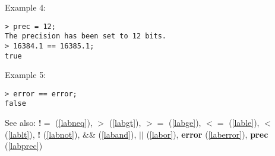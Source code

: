 \noindent Example 4: 
\begin{center}\begin{minipage}{15cm}\begin{Verbatim}[frame=single]
> prec = 12;
The precision has been set to 12 bits.
> 16384.1 == 16385.1;
true
\end{Verbatim}
\end{minipage}\end{center}
\noindent Example 5: 
\begin{center}\begin{minipage}{15cm}\begin{Verbatim}[frame=single]
> error == error;
false
\end{Verbatim}
\end{minipage}\end{center}
See also: \textbf{!$=$} (\ref{labneq}), \textbf{$>$} (\ref{labgt}), \textbf{$>=$} (\ref{labge}), \textbf{$<=$} (\ref{lable}), \textbf{$<$} (\ref{lablt}), \textbf{!} (\ref{labnot}), \textbf{$\&\&$} (\ref{laband}), \textbf{$||$} (\ref{labor}), \textbf{error} (\ref{laberror}), \textbf{prec} (\ref{labprec})
